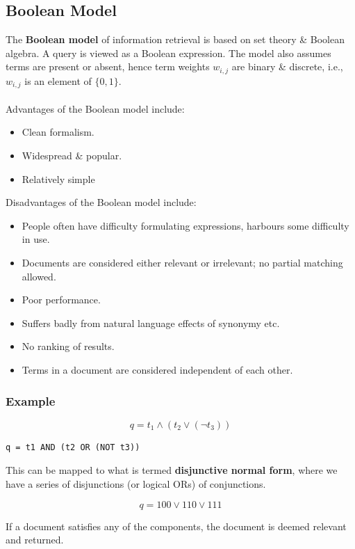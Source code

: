 \documentclass[a4paper,11pt]{article}
\begin{document}
\subsection{Boolean Model}
The \textbf{Boolean model} of information retrieval is based on set theory \& Boolean algebra.
A query is viewed as a Boolean expression.
The model also assumes terms are present or absent, hence term weights $w_{i,j}$ are binary \& discrete, i.e., 
$w_{i,j}$ is an element of $\{0, 1\}$.
\\\\
Advantages of the Boolean model include:
\begin{itemize}
    \item   Clean formalism.
    \item   Widespread \& popular.
    \item   Relatively simple
\end{itemize}

Disadvantages of the Boolean model include:
\begin{itemize}
    \item   People often have difficulty formulating expressions, harbours some difficulty in use.
    \item   Documents are considered either relevant or irrelevant; no partial matching allowed.
    \item   Poor performance.
    \item   Suffers badly from natural language effects of synonymy etc.
    \item   No ranking of results.
    \item   Terms in a document are considered independent of each other.
\end{itemize}

\subsubsection{Example}
$$
q = t_1 \land (t_2 \lor (\neg t_3))
$$

\begin{verbatim}
q = t1 AND (t2 OR (NOT t3))
\end{verbatim}

This can be mapped to what is termed \textbf{disjunctive normal form}, where we have a series of disjunctions 
(or logical ORs) of conjunctions.

$$
q = 100 \lor 110 \lor 111
$$

If a document satisfies any of the components, the document is deemed relevant and returned.
\end{document}
